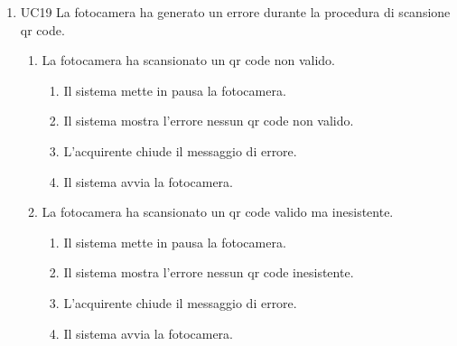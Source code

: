 \documentclass[a4paper, 12pt]{article}
\begin{document}
\begin{enumerate}
    \item UC19 La fotocamera ha generato un errore durante la procedura di scansione qr code.
    \begin{enumerate}
        \item La fotocamera ha scansionato un qr code non valido.
        \begin{enumerate}
            \item Il sistema mette in pausa la fotocamera.
            \item Il sistema mostra l'errore nessun qr code non valido.
            \item L'acquirente chiude il messaggio di errore.
            \item Il sistema avvia la fotocamera.
        \end{enumerate}
        \item La fotocamera ha scansionato un qr code valido ma inesistente.
        \begin{enumerate}
            \item Il sistema mette in pausa la fotocamera.
            \item Il sistema mostra l'errore nessun qr code inesistente.
            \item L'acquirente chiude il messaggio di errore.
            \item Il sistema avvia la fotocamera.
        \end{enumerate}
    \end{enumerate}
\end{enumerate}
\end{document}
